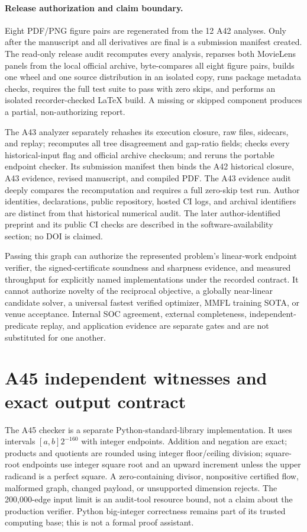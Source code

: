 \paragraph{Release authorization and claim boundary.}
Eight PDF/PNG figure pairs are regenerated from the 12 A42 analyses.  Only
after the manuscript and all derivatives are final is a
submission manifest created.  The read-only release audit recomputes every
analysis, reparses both MovieLens panels from the local official archive,
byte-compares all eight figure pairs, builds one wheel and one source
distribution in an isolated copy, runs package metadata checks, requires the
full test suite to pass with zero skips, and performs an isolated
recorder-checked \LaTeX{} build.  A missing or skipped component produces a
partial, non-authorizing report.

The A43 analyzer separately rehashes its execution closure, raw files,
sidecars, and replay; recomputes all tree disagreement and gap-ratio fields;
checks every historical-input flag and official archive checksum; and reruns
the portable endpoint checker.  Its submission manifest then binds the A42
historical closure, A43 evidence, revised manuscript, and compiled PDF.  The
A43 evidence audit deeply compares the recomputation and requires a full
zero-skip test run. Author identities, declarations, public repository, hosted
CI logs, and archival identifiers are distinct from that historical numerical
audit. The later author-identified preprint and its public CI checks are
described in the software-availability section; no DOI is claimed.

Passing this graph can authorize the represented problem's linear-work endpoint
verifier, the signed-certificate soundness and sharpness evidence, and measured
throughput for explicitly named implementations under the recorded contract.
It cannot authorize novelty of the reciprocal objective, a globally
near-linear candidate solver, a universal fastest verified optimizer, MMFL
training SOTA, or venue acceptance.  Internal SOC agreement, external
completeness, independent-predicate replay, and application evidence are
separate gates and are not substituted for one another.

\section{A45 independent witnesses and exact output contract}
\label{app:a45-checker}

The A45 checker is a separate Python-standard-library implementation. It uses
intervals $[a,b]2^{-160}$ with integer endpoints. Addition and negation are
exact; products and quotients are rounded using integer floor/ceiling division;
square-root endpoints use integer square root and an upward increment unless
the upper radicand is a perfect square. A zero-containing divisor, nonpositive
certified flow, malformed graph, changed payload, or unsupported dimension
rejects. The 200,000-edge input limit is an audit-tool resource bound, not a
claim about the production verifier. Python big-integer correctness remains
part of its trusted computing base; this is not a formal proof assistant.

